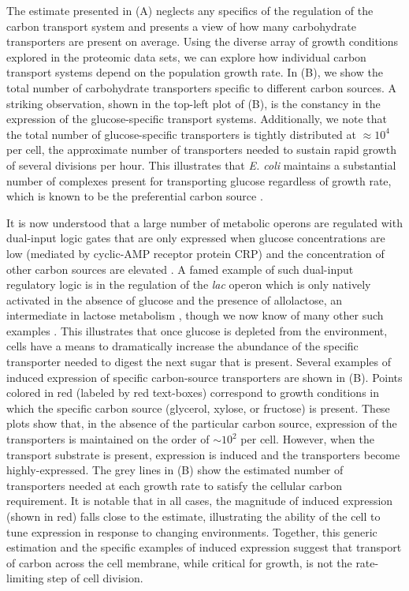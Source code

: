 The estimate presented in (A) neglects any specifics of the
regulation of the carbon transport system and presents a  view of how
many carbohydrate transporters are present on average. Using the diverse array
of growth conditions explored in the proteomic data sets, we can explore how
individual carbon transport systems depend on the population growth rate. In
(B), we show the total number of carbohydrate transporters
specific to different carbon sources. A striking observation, shown in the
top-left plot of (B), is the constancy in the expression of the
glucose-specific transport systems. Additionally, we note that the total number
of glucose-specific transporters is tightly distributed at $\approx 10^4$ per cell,
the approximate number of transporters needed to sustain rapid growth of several
divisions per hour. This
illustrates that \textit{E. coli} maintains a substantial number of complexes
present for transporting glucose regardless of growth rate, which is known to be the preferential carbon
source \citep{monod1947, liu2005a, aidelberg2014}.

It is now understood that a large number of metabolic operons are regulated
with dual-input logic gates that are only expressed when glucose
concentrations are low (mediated by cyclic-AMP receptor protein CRP) and the
concentration of other carbon sources are elevated \citep{gama-castro2016, zhang2014a}. A
famed example of such dual-input regulatory logic is in the regulation of the
\textit{lac} operon which is only natively activated in the absence of glucose and the
presence of allolactose, an intermediate in lactose metabolism \citep{jacob1961}, though
we now know of many other such examples \citep{ireland2020, gama-castro2016,
belliveau2018}. This illustrates that once glucose is depleted from the
environment, cells have a means to dramatically increase the abundance of the
specific transporter needed to digest the next sugar that is present. Several
examples of induced expression of specific carbon-source transporters are
shown in (B). Points colored in red (labeled by red
text-boxes) correspond to growth conditions in which the specific carbon source
(glycerol, xylose, or fructose) is present. These plots show that, in the
absence of the particular carbon source, expression of the transporters is
maintained on the order of $\sim 10^2$ per cell. However, when the transport
substrate is present, expression is induced and the
transporters become highly-expressed. The grey lines in (B)
show the estimated number of transporters needed at each growth rate to satisfy
the cellular carbon requirement. It is notable that  in all cases, the magnitude
of induced expression (shown in red) falls close to the estimate, illustrating
the ability of the cell to tune expression in response to changing environments. Together, this generic estimation and the specific
examples of induced expression suggest that transport of carbon across the cell
membrane, while critical for growth, is not the rate-limiting step of cell division.

